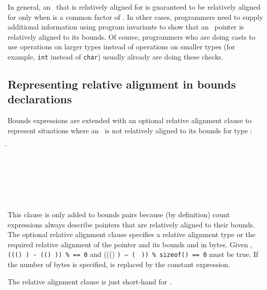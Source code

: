 In general, an
\arrayptrT\ that is
relatively aligned for  is guaranteed to be relatively aligned
for  only
when  is a common factor of
. In other cases, programmers need to
supply additional information using program invariants to show that an
\arrayptr\ pointer is relatively aligned to its bounds. Of
course, programmers who are doing casts to use operations on larger
types instead of operations on smaller types (for example, \texttt{int}
instead of \texttt{char}) usually already are doing these checks.

\subsection{Representing relative alignment in bounds declarations}
\label{section:representing-relative-alignment}

Bounds expressions are extended with an optional relative alignment 
clause to represent situations where an \arrayptrT\ is not relatively 
aligned to its bounds for type :

\begin{tabbing}
\=\\
\> \var{\ldots{}}\\
\> 
          \\
\\
\\
\>  \\
\>  
\end{tabbing}

This clause is only added to bounds pairs because (by definition) count
expressions always describe pointers that are relatively aligned to
their bounds. The optional relative alignment clause specifies a
relative alignment type  or the required relative alignment of
the pointer and its bounds and in bytes. Given 
,
\texttt{(((\arrayptrchar) ) - ((\arrayptrchar) )) \%
         == 0} and
(((\arrayptrchar) \texttt{) --
(\arrayptrchar\ } \texttt{)) \%
sizeof(}\texttt{) == 0} must be true. If the number of bytes is
specified,  is replaced by the
constant expression.

The relative alignment clause 
is just short-hand for .

